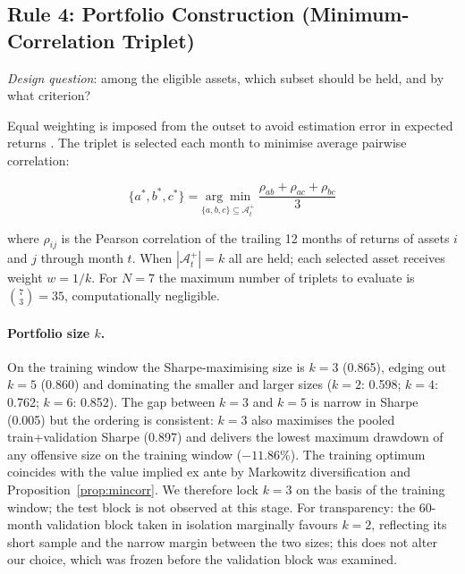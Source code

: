 \subsection{Rule 4: Portfolio Construction (Minimum-Correlation Triplet)}
\label{sec:triplet}

\textit{Design question}: among the eligible assets, which subset should be held,
and by what criterion?

Equal weighting is imposed from the outset to avoid estimation error in expected
returns \citep{demiguel2009}. The triplet is selected each month to minimise
average pairwise correlation:

\begin{equation}
\{a^*, b^*, c^*\} = \underset{\{a,b,c\} \subseteq \mathcal{A}_t^+}{\arg\min}
\;\frac{\rho_{ab} + \rho_{ac} + \rho_{bc}}{3}
\label{eq:triplet}
\end{equation}

where $\rho_{ij}$ is the Pearson correlation of the trailing 12 months of returns
of assets $i$ and $j$ through month $t$. When $|\mathcal{A}_t^+| = k$ all are held;
each selected asset receives weight $w = 1/k$. For $N = 7$ the maximum number of
triplets to evaluate is $\binom{7}{3} = 35$, computationally negligible.

\paragraph{Portfolio size $k$.}
On the training window the Sharpe-maximising size is $k = 3$ (0.865), edging out
$k = 5$ (0.860) and dominating the smaller and larger sizes ($k = 2$: 0.598;
$k = 4$: 0.762; $k = 6$: 0.852). The gap between $k=3$ and $k=5$ is narrow in
Sharpe (0.005) but the ordering is consistent: $k=3$ also maximises the pooled
train+validation Sharpe (0.897) and delivers the lowest maximum drawdown of any
offensive size on the training window ($-11.86\%$). The training optimum coincides
with the value implied ex ante by Markowitz diversification and
Proposition~\ref{prop:mincorr}. We therefore lock $k = 3$ on the basis of the
training window; the test block is not observed at this stage. For transparency:
the 60-month validation block taken in isolation marginally favours $k = 2$,
reflecting its short sample and the narrow margin between the two sizes; this does
not alter our choice, which was frozen before the validation block was examined.

